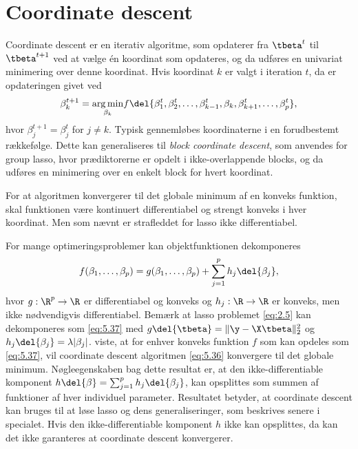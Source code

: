 \section{Coordinate descent} \label{sec:theory_coordinatedescent}
%
Coordinate descent er en iterativ algoritme, som opdaterer fra \(\tbeta^t\) til \(\tbeta^{t+1}\) ved at vælge én koordinat som opdateres, og da udføres en univariat minimering over denne koordinat.
Hvis koordinat $k$ er valgt i iteration $t$, da er opdateringen givet ved
\begin{align}
\beta_k^{t+1} =\underset{ \beta_k}{\arg \min}  f\del{ \beta_1^t, \beta_2^t, \dots, \beta_{k-1}^t, \beta_k, \beta_{k+1}^t, \dots, \beta_p^t  }, \label{eq:5.36}
\end{align}
hvor $\beta_j^{t+1} = \beta_j^t$ for $j \neq k$. 
Typisk gennemløbes koordinaterne i en forudbestemt rækkefølge.
Dette kan generaliseres til \textit{block coordinate descent}, som anvendes for group lasso, hvor prædiktorerne er opdelt i ikke-overlappende blocks, og da udføres en minimering over en enkelt block for hvert koordinat.

For at algoritmen konvergerer til det globale minimum af en konveks funktion, skal funktionen være kontinuert differentiabel og strengt konveks i hver koordinat. 
Men som nævnt er strafleddet for lasso ikke differentiabel.

For mange optimeringsproblemer kan objektfunktionen dekomponeres
\begin{align}
f(\beta_1, \dots, \beta_p) = g(\beta_1, \dots, \beta_p) + \sum_{j = 1}^p h_j \del{\beta_j}, \label{eq:5.37}
\end{align}
hvor \(g: \R^p \rightarrow \R\) er differentiabel og konveks og \(h_j: \R \rightarrow \R\) er konveks, men ikke nødvendigvis differentiabel.
Bemærk at lasso problemet \eqref{eq:2.5} kan dekomponeres som \eqref{eq:5.37} med \(g \del{\tbeta} =\Vert \y - \X \tbeta \Vert_2^2\) og \(h_j \del{\beta_j} = \lambda \vert \beta_j \vert\).
\citep{Tseng_coordinate} viste, at for enhver konveks funktion \(f\) som kan opdeles som \eqref{eq:5.37}, vil coordinate descent algoritmen \eqref{eq:5.36} konvergere til det globale minimum. 
Nøgleegenskaben bag dette resultat er, at den ikke-differentiable komponent \(h \del{\beta} = \sum_{j=1}^p h_j \del{\beta_j}\), kan opsplittes som summen af funktioner af hver individuel parameter.
Resultatet betyder, at coordinate descent kan bruges til at løse lasso og dens generaliseringer, som beskrives senere i specialet.
Hvis den ikke-differentiable komponent \(h\) ikke kan opsplittes, da kan det ikke garanteres at coordinate descent konvergerer.


